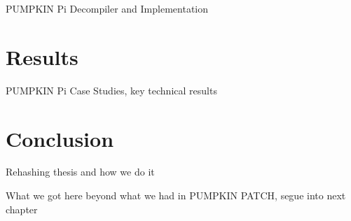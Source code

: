 PUMPKIN Pi Decompiler and Implementation

\section{Results}

PUMPKIN Pi Case Studies, key technical results

\section{Conclusion}

Rehashing thesis and how we do it

What we got here beyond what we had in PUMPKIN PATCH, segue into next chapter



%

%

%

%

%

%

%

%

%

%

%

%

%

%

%

%

%

